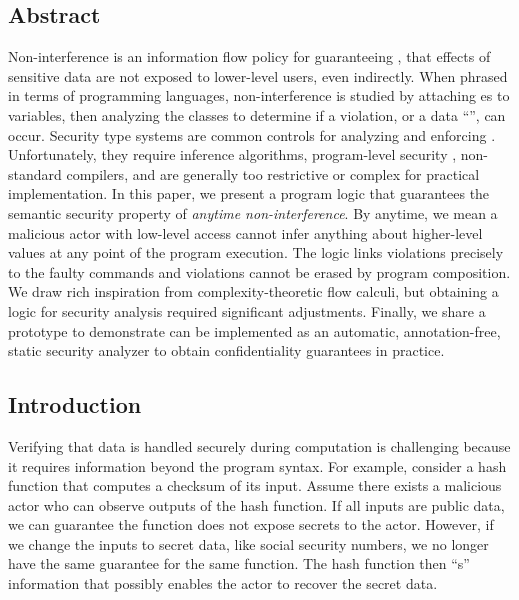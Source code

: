 \subsection*{Abstract}
\label{subsec:ni-abs}

Non-interference is an information flow
policy for guaranteeing ,
\ie that effects of sensitive data are not exposed to lower-level users, even
indirectly. When phrased in terms of programming languages, non-interference is
studied by attaching es to variables, then analyzing the
classes to determine if a violation, or a data \enquote{}, can occur.
Security type systems are common controls for
analyzing and enforcing . Unfortunately, they require
inference algorithms, program-level security , non-standard
compilers, and are generally too restrictive or complex for practical
implementation. In this paper, we present a program logic \lname that guarantees
the semantic security property of \emph{anytime
non-interference}. By anytime, we mean a
malicious actor with low-level access cannot infer anything about higher-level
values at any point of the program execution. The logic links
 violations precisely to the faulty commands and
violations cannot be erased by program composition. We draw rich inspiration
from complexity-theoretic flow calculi, but obtaining a logic for security
analysis required significant adjustments. Finally, we share a prototype to
demonstrate \lname can be implemented as an automatic, annotation-free, static
security analyzer to obtain confidentiality guarantees in practice.

\subsection{Introduction}
\label{subsec:ni-introduction}

Verifying that data is handled securely during computation is challenging
because it requires information beyond the program syntax. For example, consider
a hash function that computes a checksum of its input. Assume there exists a
malicious actor who can observe outputs of the hash function. If all inputs are
public data, we can guarantee the function does not expose secrets to the actor.
However, if we change the inputs to secret data, like social security numbers,
we no longer have the same guarantee for the same function. The hash function
then \enquote{s} information that possibly enables
the actor to recover the secret data.

